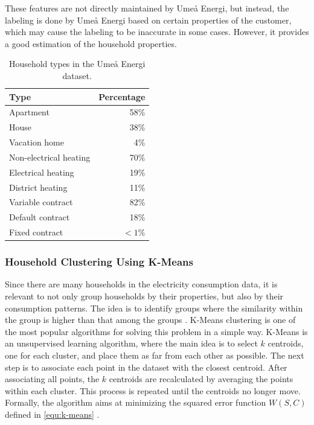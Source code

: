 These features are not directly maintained by Umeå Energi, but instead, the labeling is done by Umeå Energi based on certain properties of the customer, which may cause the labeling to be inaccurate in some cases. However, it provides a good estimation of the household properties.

\begin{table}[h!tbp]%
    \centering
    \caption{Household types in the Umeå Energi dataset.}
    \label{tab:household-specifications}
    \small
    \begin{tabularx}{\linewidth}{l r}
        \textbf{Type}          & \textbf{Percentage} \\
        \midrule
        Apartment              & 58\%                \\
        House                  & 38\%                \\
        Vacation home          & 4\%                 \\
        \midrule
        Non-electrical heating & 70\%                \\
        Electrical heating     & 19\%                \\
        District heating       & 11\%                \\
        \midrule
        Variable contract      & 82\%                \\
        Default contract       & 18\%                \\
        Fixed contract         & $<1\%$              \\
    \end{tabularx}
\end{table}

\subsubsection{Household Clustering Using K-Means}

Since there are many households in the electricity consumption data, it is relevant to not only group households by their properties, but also by their consumption patterns. The idea is to identify groups where the similarity within the group is higher than that among the groups \cite{khan_ensemble_2021}. K-Means clustering is one of the most popular algorithms for solving this problem in a simple way. K-Means is an unsupervised learning algorithm, where the main idea is to select $k$ centroids, one for each cluster, and place them as far from each other as possible. The next step is to associate each point in the dataset with the closest centroid. After associating all points, the $k$ centroids are recalculated by averaging the points within each cluster. This process is repeated until the centroids no longer move. Formally, the algorithm aims at minimizing the squared error function $W(S,C)$ defined in \autoref{equ:k-means} \cite{kodinariya_review_2013}.

